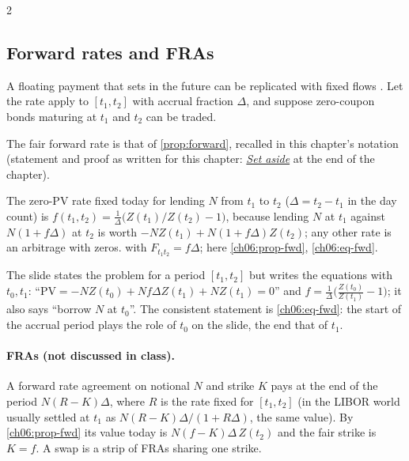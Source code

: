 \begin{paracol}{2}
\subsection{Forward rates and FRAs}
A floating payment that sets in the future can be replicated with fixed flows . Let the rate
apply to $[t_1,t_2]$ with accrual fraction $\Delta$, and suppose zero-coupon bonds maturing at $t_1$ and $t_2$
can be traded.

The fair forward rate is that of \cref{prop:forward}, recalled \inmargin{} in this chapter's notation (statement and proof as written for this chapter: \hyperref[ch06:sec-setaside]{\emph{Set aside}} at the end of the chapter).
\begin{recall}
The zero-PV rate fixed today for lending $N$ from $t_1$ to $t_2$ ($\Delta=t_2-t_1$ in the day count) is
$f(t_1,t_2)=\frac1\Delta\bigl(Z(t_1)/Z(t_2)-1\bigr)$, because lending $N$ at $t_1$ against $N(1+f\Delta)$ at $t_2$ is worth $-NZ(t_1)+N(1+f\Delta)Z(t_2)$; any other rate is an arbitrage with zeros.  with $F_{t_1t_2}=f\Delta$; here \cref{ch06:prop-fwd}, \eqref{ch06:eq-fwd}.
\end{recall}

\begin{coursenote}
The slide states the problem for a period $[t_1,t_2]$ but writes the equations with $t_0,t_1$:
``$\mathrm{PV}=-NZ(t_0)+Nf\Delta Z(t_1)+NZ(t_1)=0$'' and $f=\frac1\Delta\bigl(\frac{Z(t_0)}{Z(t_1)}-1\bigr)$; it also
says ``borrow $N$ at $t_0$''. The consistent statement is \eqref{ch06:eq-fwd}: the start of the accrual period
plays the role of $t_0$ on the slide, the end that of $t_1$.
\end{coursenote}

\paragraph{FRAs (not discussed in class).} A forward rate agreement on notional $N$ and strike $K$ pays at
the end of the period $N(R-K)\Delta$, where $R$ is the rate fixed for $[t_1,t_2]$ (in the LIBOR world
usually settled at $t_1$ as $N(R-K)\Delta/(1+R\Delta)$, the same value). By \cref{ch06:prop-fwd} its value today
is $N(f-K)\Delta\,Z(t_2)$ and the fair strike is $K=f$. A swap is a strip of FRAs sharing one strike.


\end{paracol}
